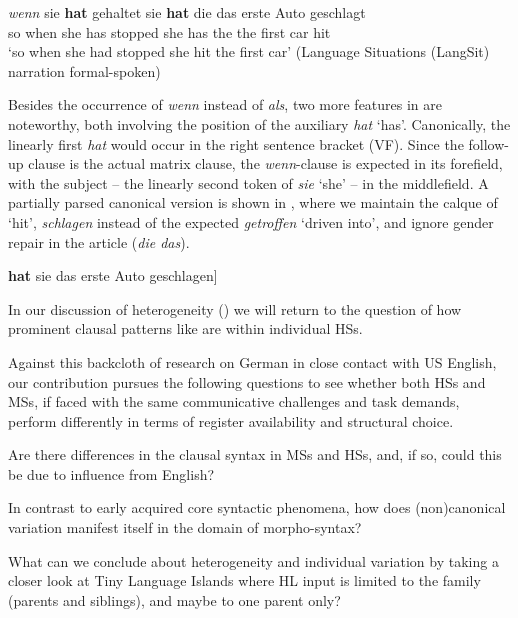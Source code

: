 \documentclass[output=paper]{langscibook}
\begin{document}
\ea%
    \label{ex:tsehaye:gehaltet}
     \textit{{wenn}} {sie} \textbf{{hat}} {gehaltet} {sie} \textbf{{hat}} {die} {das} {erste} {Auto} {geschlagt}\\
         so {when} she {has} stopped she {has} the the first car hit \\
    \glt ‘so when she had stopped she hit the first car’ (Language Situations (LangSit) narration formal-spoken)
\z

Besides the occurrence of \textit{wenn} instead of \textit{als}, two more features in  are noteworthy, both involving the position of the auxiliary \textit{hat} ‘has’. Canonically, the linearly first \textit{hat} would occur in the right sentence bracket (VF). Since the follow-up clause is the actual matrix clause, the \textit{wenn}\hyp clause is expected in its forefield, with the subject – the linearly second token of \textit{sie} ‘she’ – in the middlefield. A partially parsed canonical version is shown in , where we maintain the calque of ‘hit’, \textit{schlagen} instead of the expected \textit{getroffen} ‘driven into’, and ignore gender repair in the article (\textit{die das}).

\ea%
    \label{ex:tsehaye:geschlagen}\relax
    [{\textsubscript{S}} [{\textsubscript{S}} {als sie gehalten} \textbf{{hat}}] \textbf{{hat}} {sie das erste Auto geschlagen}]
\z

In our discussion of heterogeneity () we will return to the question of how prominent clausal patterns like  are within individual HSs.

Against this backcloth of research on German in close contact with US English, our contribution pursues the following questions to see whether both HSs and MSs, if faced with the same communicative challenges and task demands, perform differently in terms of register availability and structural choice. 

\begin{description}[font=\normalfont]
\item[RQ1:] Are there differences in the clausal syntax in MSs and HSs, and, if so, could this be due to influence from English?

\item[RQ2:] In contrast to early acquired core syntactic phenomena, how does (non)ca\-non\-i\-cal variation manifest itself in the domain of morpho-syntax?

\item[RQ3:] What can we conclude about heterogeneity and individual variation by taking a closer look at Tiny Language Islands where HL input is limited to the family (parents and siblings), and maybe to one parent only?
\end{description}
\end{document}
